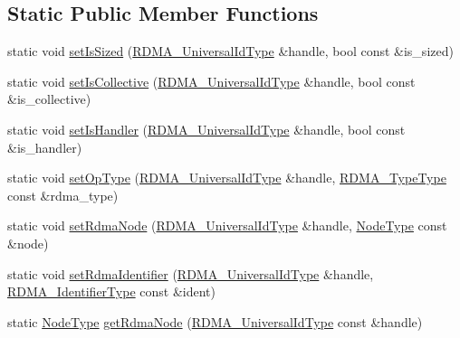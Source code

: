 \subsection*{Static Public Member Functions}
\begin{DoxyCompactItemize}
\item 
static void \hyperlink{structvt_1_1rdma_1_1_handle_manager_a768264cec2a3b9bc0d354624cfa7d863}{set\+Is\+Sized} (\hyperlink{structvt_1_1rdma_1_1_handle_manager_acebfe9aa5887a015cc5da18f4f7e55ae}{R\+D\+M\+A\+\_\+\+Universal\+Id\+Type} \&handle, bool const \&is\+\_\+sized)
\item 
static void \hyperlink{structvt_1_1rdma_1_1_handle_manager_a81e715ef00f47433e44f77b210729b4e}{set\+Is\+Collective} (\hyperlink{structvt_1_1rdma_1_1_handle_manager_acebfe9aa5887a015cc5da18f4f7e55ae}{R\+D\+M\+A\+\_\+\+Universal\+Id\+Type} \&handle, bool const \&is\+\_\+collective)
\item 
static void \hyperlink{structvt_1_1rdma_1_1_handle_manager_a6d4b1801135d4dfd0b8299e8f879eb25}{set\+Is\+Handler} (\hyperlink{structvt_1_1rdma_1_1_handle_manager_acebfe9aa5887a015cc5da18f4f7e55ae}{R\+D\+M\+A\+\_\+\+Universal\+Id\+Type} \&handle, bool const \&is\+\_\+handler)
\item 
static void \hyperlink{structvt_1_1rdma_1_1_handle_manager_a3218bb2c602a6051318249f99fea1354}{set\+Op\+Type} (\hyperlink{structvt_1_1rdma_1_1_handle_manager_acebfe9aa5887a015cc5da18f4f7e55ae}{R\+D\+M\+A\+\_\+\+Universal\+Id\+Type} \&handle, \hyperlink{namespacevt_1_1rdma_ac848e1d9da43db6294bd06f83e5d3946}{R\+D\+M\+A\+\_\+\+Type\+Type} const \&rdma\+\_\+type)
\item 
static void \hyperlink{structvt_1_1rdma_1_1_handle_manager_a8237e079f8a8ccf049b51778a1502e16}{set\+Rdma\+Node} (\hyperlink{structvt_1_1rdma_1_1_handle_manager_acebfe9aa5887a015cc5da18f4f7e55ae}{R\+D\+M\+A\+\_\+\+Universal\+Id\+Type} \&handle, \hyperlink{namespacevt_a866da9d0efc19c0a1ce79e9e492f47e2}{Node\+Type} const \&node)
\item 
static void \hyperlink{structvt_1_1rdma_1_1_handle_manager_a4ae25273b2cfd378111090752b9517dc}{set\+Rdma\+Identifier} (\hyperlink{structvt_1_1rdma_1_1_handle_manager_acebfe9aa5887a015cc5da18f4f7e55ae}{R\+D\+M\+A\+\_\+\+Universal\+Id\+Type} \&handle, \hyperlink{namespacevt_1_1rdma_a3b7f2eba1e9063a37d9301061c1432f1}{R\+D\+M\+A\+\_\+\+Identifier\+Type} const \&ident)
\item 
static \hyperlink{namespacevt_a866da9d0efc19c0a1ce79e9e492f47e2}{Node\+Type} \hyperlink{structvt_1_1rdma_1_1_handle_manager_a80488969f034c0ae7e525c9f249b59af}{get\+Rdma\+Node} (\hyperlink{structvt_1_1rdma_1_1_handle_manager_acebfe9aa5887a015cc5da18f4f7e55ae}{R\+D\+M\+A\+\_\+\+Universal\+Id\+Type} const \&handle)

\end{DoxyCompactItemize}
